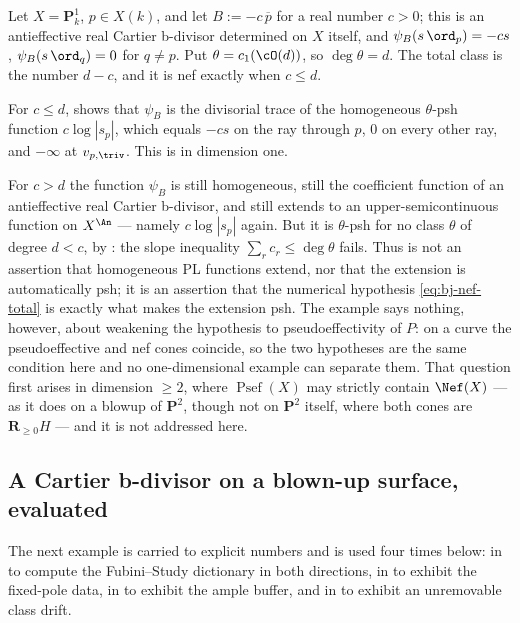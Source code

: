 \begin{example}
\label{ex:ch38-usc-not-psh}
Let $X=\mathbf P^1_k$, $p\in X(k)$, and let
$B:=-c\,\overline p$ for a real number $c>0$; this is an antieffective
real Cartier b-divisor determined on $X$ itself, and
$\psi_B(s\,\ord_p)=-cs$, $\psi_B(s\,\ord_q)=0$ for $q\neq p$.  Put
$\theta=c_1(\cO(d))$, so $\deg\theta=d$.  The total class is the
number $d-c$, and it is nef exactly when $c\leq d$.

For $c\leq d$,  shows that
$\psi_B$ is the divisorial trace of the homogeneous $\theta$-psh
function $c\log|s_p|$, which equals $-cs$ on the ray through $p$,
$0$ on every other ray, and $-\infty$ at $v_{p,\triv}$.  This is
 in dimension one.

For $c>d$ the function $\psi_B$ is still homogeneous, still the
coefficient function of an antieffective real Cartier b-divisor, and still
extends to an upper-semicontinuous function on $X^{\An}$ --- namely
$c\log|s_p|$ again.  But it is $\theta$-psh for no class $\theta$ of
degree $d<c$, by : the slope
inequality $\sum_rc_r\leq\deg\theta$ fails.  Thus
 is not an assertion that
homogeneous PL functions extend, nor that the extension is automatically
psh; it is an assertion that the numerical hypothesis \eqref{eq:bj-nef-total}
is exactly what makes the extension psh.  The example says nothing, however, about weakening the
hypothesis to pseudoeffectivity of $P$: on a curve the pseudoeffective
and nef cones coincide, so the two hypotheses are the same condition here
and no one-dimensional example can separate them.  That question first
arises in dimension $\geq2$, where $\operatorname{Psef}(X)$ may strictly
contain $\Nef(X)$ --- as it does on a blowup of $\mathbf P^2$, though not
on $\mathbf P^2$ itself, where both cones are $\mathbf R_{\geq0}H$ --- and
it is not addressed here.
\end{example}

\subsection{A Cartier b-divisor on a blown-up surface, evaluated}
\label{sec:ch38-surface-example}

The next example is carried to explicit numbers and is used four times
below: in  to compute the
Fubini--Study dictionary in both directions, in
 to exhibit the fixed-pole data, in
 to exhibit the ample buffer, and in
 to exhibit an unremovable class drift.

